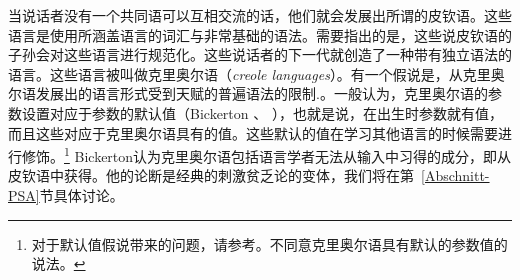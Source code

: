当说话者没有一个共同语可以互相交流的话，他们就会发展出所谓的皮钦语。这些语言是使用所涵盖语言的词汇与非常基础的语法。需要指出的是，这些说皮钦语的子孙会对这些语言进行规范化。这些说话者的下一代就创造了一种带有独立语法的语言。这些语言被叫做克里奥尔语（\emph{creole languages}）。有一个假说是，从克里奥尔语发展出的语言形式受到天赋的普遍语法的限制\citep{Bickerton84a}.。一般认为，克里奥尔语的参数设置对应于参数的默认值（Bickerton \citeyear[]{Bickerton84b}、
\citeyear[]{Bickerton84a}），也就是说，在出生时参数就有值，而且这些对应于克里奥尔语具有的值。这些默认的值在学习其他语言的时候需要进行修饰。\footnote{
对于默认值假说带来的问题，请参考。\citet[, fn.\,13]{Bickerton97a}不同意克里奥尔语具有默认的参数值的说法。
} 
Bickerton认为克里奥尔语包括语言学者无法从输入中习得的成分，即从皮钦语中获得。他的论断是经典的刺激贫乏论的变体，我们将在第~\ref{Abschnitt-PSA}节具体讨论。

